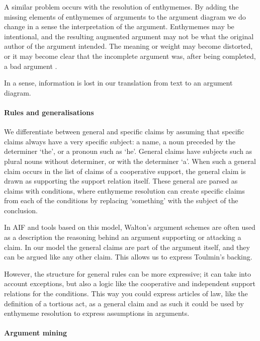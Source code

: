 A similar problem occurs with the resolution of enthymemes. By adding the missing elements of enthymemes of arguments to the argument diagram we do change in a sense the interpretation of the argument. Enthymemes may be intentional, and the resulting augmented argument may not be what the original author of the argument intended. The meaning or weight may become distorted, or it may become clear that the incomplete argument was, after being completed, a bad argument \cite{waltonReed2005}.

In a sense, information is lost in our translation from text to an argument diagram.

\paragraph{Rules and generalisations}

We differentiate between general and specific claims by assuming that specific claims always have a very specific subject: a name, a noun preceded by the determiner `the', or a pronoun such as `he'. General claims have subjects such as plural nouns without determiner, or with the  determiner `a'. When such a general claim occurs in the list of claims of a cooperative support, the general claim is drawn as supporting the support relation itself. These general are parsed as claims with conditions, where enthymeme resolution can create specific claims from each of the conditions by replacing `something' with the subject of the conclusion. 

In AIF and tools based on this model, Walton's argument schemes are often used as a description the reasoning behind an argument supporting or attacking a claim. In our model the general claims are part of the argument itself, and they can be argued like any other claim. This allows us to express Toulmin's backing. 

However, the structure for general rules can be more expressive; it can take into account exceptions, but also a logic like the cooperative and independent support relations for the conditions. This way you could express articles of law, like the definition of a tortious act, as a general claim and as such it could be used by enthymeme resolution to express assumptions in arguments.

\paragraph{Argument mining}

